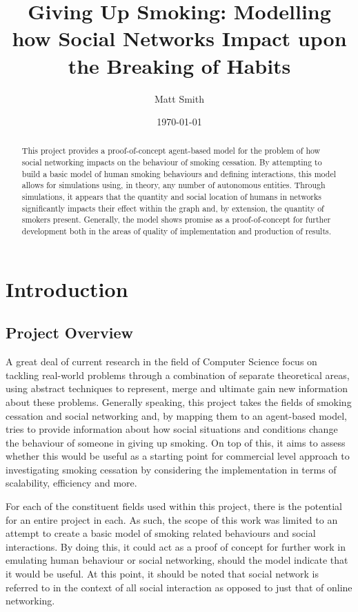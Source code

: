 \documentclass[]{report}
\begin{document}
\title{Giving Up Smoking: Modelling how Social Networks Impact upon the Breaking of Habits}
\author{Matt Smith}
\date{\today}
\maketitle
\begin{abstract}
This project provides a proof-of-concept agent-based model for the problem of how social networking impacts on the behaviour of smoking cessation. By attempting to build a basic model of human smoking behaviours and defining interactions, this model allows for  simulations using, in theory, any number of autonomous entities. Through simulations, it appears that the quantity and social location of humans in networks significantly impacts their effect within the graph and, by extension, the quantity of smokers present. Generally, the model shows promise as a proof-of-concept for further development both in the areas of quality of implementation and production of results.
\end{abstract}

\tableofcontents

%
%
\chapter{Introduction}

\section{Project Overview}
A great deal of current research in the field of Computer Science focus on tackling real-world problems through a combination of separate theoretical areas, using abstract techniques to represent, merge and ultimate gain new information about these problems. Generally speaking, this project takes the fields of smoking cessation and social networking and, by mapping them to an agent-based model, tries to provide information about how social situations and conditions change the behaviour of someone in giving up smoking. On top of this, it aims to assess whether this would be useful as a starting point for commercial level approach to investigating smoking cessation by considering the implementation in terms of scalability, efficiency and more. 

For each of the constituent fields used within this project, there is the potential for an entire project in each. As such, the scope of this work was limited to an attempt to create a basic model of smoking related behaviours and social interactions. By doing this, it could act as a proof of concept for further work in emulating human behaviour or social networking, should the model indicate that it would be useful. At this point, it should be noted that social network is referred to in the context of all social interaction as opposed to just that of online networking. 
\end{document}
